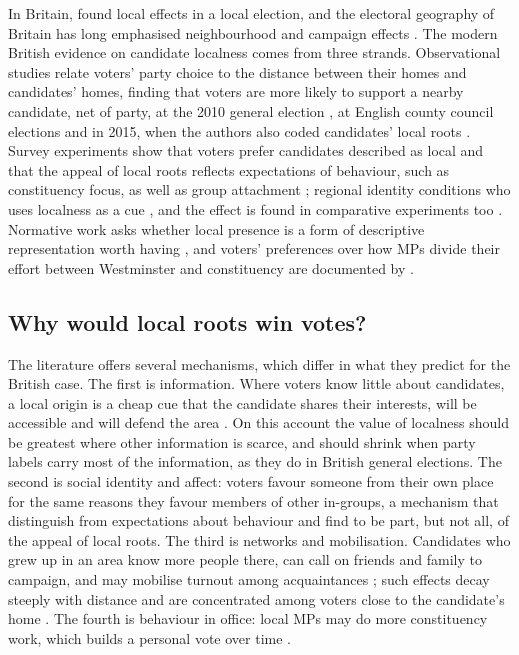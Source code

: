 \documentclass[11pt,a4paper]{article}
\begin{document}
In Britain, \citet{johnston1974} found local effects in a local election, and the electoral geography of Britain has long emphasised neighbourhood and campaign effects \citep{johnstonpattie2006}. The modern British evidence on candidate localness comes from three strands. Observational studies relate voters' party choice to the distance between their homes and candidates' homes, finding that voters are more likely to support a nearby candidate, net of party, at the 2010 general election \citep{arzheimerevans2012}, at English county council elections \citep{arzheimerevans2014} and in 2015, when the authors also coded candidates' local roots \citep{evans2017}. Survey experiments show that voters prefer candidates described as local \citep{campbellcowley2014} and that the appeal of local roots reflects expectations of behaviour, such as constituency focus, as well as group attachment \citep{campbell2019}; regional identity conditions who uses localness as a cue \citep{collignonsajuria2018}, and the effect is found in comparative experiments too \citep{harfst2024}. Normative work asks whether local presence is a form of descriptive representation worth having \citep{childscowley2011}, and voters' preferences over how MPs divide their effort between Westminster and constituency are documented by \citet{vivyanwagner2016}.

\subsection{Why would local roots win votes?}
The literature offers several mechanisms, which differ in what they predict for the British case. The first is information. Where voters know little about candidates, a local origin is a cheap cue that the candidate shares their interests, will be accessible and will defend the area \citep{shugart2005}. On this account the value of localness should be greatest where other information is scarce, and should shrink when party labels carry most of the information, as they do in British general elections. The second is social identity and affect: voters favour someone from their own place for the same reasons they favour members of other in-groups, a mechanism that \citet{campbell2019} distinguish from expectations about behaviour and find to be part, but not all, of the appeal of local roots. The third is networks and mobilisation. Candidates who grew up in an area know more people there, can call on friends and family to campaign, and may mobilise turnout among acquaintances \citep{key1949,goreckimarsh2012,panagopoulos2017}; such effects decay steeply with distance \citep{gimpel2008} and are concentrated among voters close to the candidate's home \citep{arzheimerevans2012}. The fourth is behaviour in office: local MPs may do more constituency work, which builds a personal vote over time \citep{cain1987,vivyanwagner2016}.
\end{document}
